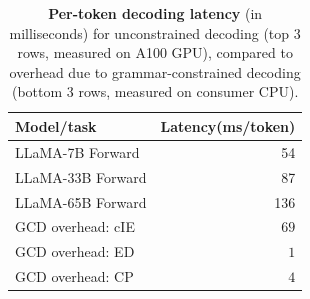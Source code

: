 \begin{table}[t]
\centering
\begin{tabular}{lr}
\toprule
Model/task & Latency(ms/token) \\
\midrule
LLaMA-7B\phantom{1} Forward & 54 \\
LLaMA-33B Forward & 87 \\
LLaMA-65B Forward & 136 \\
\hline
GCD overhead: cIE & $69 $ \\
GCD overhead: ED & $1 $ \\
GCD overhead: CP & $4 $ \\
\bottomrule
\end{tabular}
\caption{\textbf{Per-token decoding latency}
(in milliseconds)
for unconstrained decoding (top 3 rows, measured on A100 GPU), compared to overhead due to grammar-constrained decoding (bottom 3 rows, measured on consumer CPU).
}
\label{tab:latency}
\end{table}